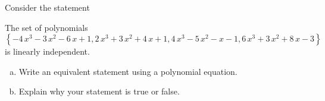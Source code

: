 
\begin{exerciseStatement}


Consider the statement 
\begin{center}\begin{minipage}{0.8\textwidth}
 The set of polynomials \( \left\{ -4 \, x^{3} - 3 \, x^{2} - 6 \, x + 1 , 2 \, x^{3} + 3 \, x^{2} + 4 \, x + 1 , 4 \, x^{3} - 5 \, x^{2} - x - 1 , 6 \, x^{3} + 3 \, x^{2} + 8 \, x - 3 \right\} \) is linearly independent.
\end{minipage}\end{center}
    


\begin{enumerate}[(a)]
\item  Write an equivalent statement using a polynomial equation.
\item  Explain why your statement is true or false.
\end{enumerate}
    
\end{exerciseStatement}
    
